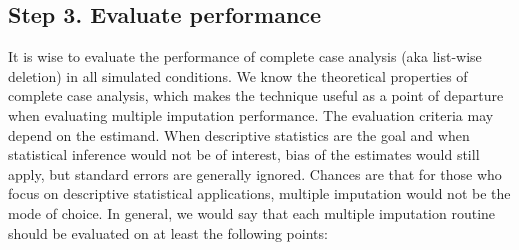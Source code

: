 \documentclass[bimj,fleqn]{w-art}
\begin{document}
\subsection{Step 3. Evaluate performance}

It is wise to evaluate the performance of complete case analysis (aka list-wise deletion) in all simulated conditions. We know the theoretical properties of complete case analysis, which makes the technique useful as a point of departure when evaluating multiple imputation performance. 
The evaluation criteria may depend on the estimand. When descriptive statistics are the goal and when statistical inference would not be of interest, bias of the estimates would still apply, but standard errors are generally ignored. Chances are that for those who focus on descriptive statistical applications, multiple imputation would not be the mode of choice. In general, we would say that each multiple imputation routine should be evaluated on at least the following points:
\end{document}
